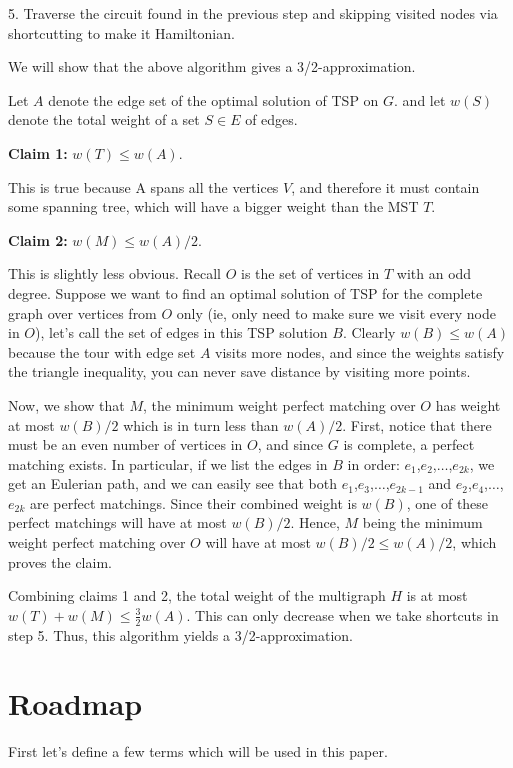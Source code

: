 \documentclass[12pt]{article}
\begin{document}
5. Traverse the circuit found in the previous step and skipping visited nodes via shortcutting to make it Hamiltonian.

We will show that the above algorithm gives a 3/2-approximation.

Let $A$ denote the edge set of the optimal solution of TSP on $G$. and let $w(S)$ denote the total weight of a set $S \in E$ of edges.

{\bf Claim 1:} $w(T)\leq w(A)$.

This is true because A spans all the vertices $V$, and therefore it must contain some spanning tree, which will have a bigger weight than the MST $T$.

{\bf Claim 2:} $w(M) \leq w(A)/2$.

This is slightly less obvious. Recall $O$ is the set of vertices in $T$ with an odd degree. Suppose we want to find an optimal solution of TSP for the complete graph over vertices from $O$ only (ie, only need to make sure we visit every node in $O$), let's call the set of edges in this TSP solution $B$. Clearly $w(B)\leq w(A)$ because the tour with edge set $A$ visits more nodes, and since the weights satisfy the triangle inequality, you can never save distance by visiting more points.

Now, we show that $M$, the minimum weight perfect matching over $O$ has weight at most $w(B)/2$ which is in turn less than $w(A)/2$. First, notice that there must be an even number of vertices in $O$, and since $G$ is complete, a perfect matching exists. In particular, if we list the edges in $B$ in order: $e_1$,$e_2$,$\ldots$,$e_{2k}$, we get an Eulerian path, and we can easily see that both $e_1$,$e_3$,$\ldots$,$e_{2k-1}$ and $e_2$,$e_4$,$\ldots$,$e_{2k}$ are perfect matchings. Since their combined weight is $w(B)$, one of these perfect matchings will have at most $w(B)/2$. Hence, $M$ being the minimum weight perfect matching over $O$ will have at most $w(B)/2 \leq w(A)/2$, which proves the claim.

Combining claims 1 and 2, the total weight of the multigraph $H$ is at most $w(T)+w(M) \leq \frac{3}{2}w(A)$. This can only decrease when we take shortcuts in step 5. Thus, this algorithm yields a 3/2-approximation.

\section{Roadmap}

First let's define a few terms which will be used in this paper.
\end{document}
